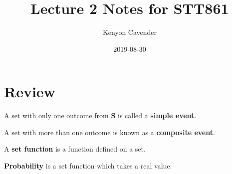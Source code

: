 \documentclass[12pt, oneside, letterpaper]{notes}
\begin{document}
\title{Lecture 2 Notes for STT861}
\author{Kenyon Cavender}
\date{2019-08-30}
\maketitle

\section{Review}
\begin{mydef}
  A set with only one outcome from \textbf{S} is called a \textbf{simple event}.
\end{mydef}

\begin{mydef}
  A set with more than one outcome is known as a \textbf{composite event}.
\end{mydef}

\begin{mydef}
  A \textbf{set function} is a function defined on a set.
\end{mydef}

\begin{mydef}
  \textbf{Probability} is a set function which takes a real value.  
\end{mydef}
\end{document}
